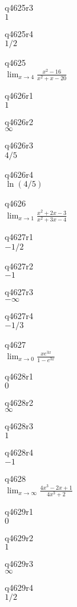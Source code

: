 q4625r3\\
\(\displaystyle 1 \)

q4625r4\\
\(\displaystyle 1/2 \)

q4625\\
\(\displaystyle \lim_{x \rightarrow 4} \frac{x^2 - 16}{x^2 + x - 20} \)

q4626r1\\
\(\displaystyle 1 \)

q4626r2\\
\(\displaystyle \infty \)

q4626r3\\
\(\displaystyle 4/5 \)

q4626r4\\
\(\displaystyle \ln(4/5) \)

q4626\\
\(\displaystyle \lim_{x \rightarrow 1} \frac{x^2 + 2x - 3}{x^2 + 3x - 4} \)

q4627r1\\
\(\displaystyle -1/2 \)

q4627r2\\
\(\displaystyle -1 \)

q4627r3\\
\(\displaystyle -\infty \)

q4627r4\\
\(\displaystyle -1/3 \)

q4627\\
\(\displaystyle \lim_{x \rightarrow 0} \frac{xe^{3x}}{1-e^{3x}} \)

q4628r1\\
\(\displaystyle 0 \)

q4628r2\\
\(\displaystyle \infty \)

q4628r3\\
\(\displaystyle 1 \)

q4628r4\\
\(\displaystyle -1 \)

q4628\\
\(\displaystyle \lim_{x \rightarrow \infty} \frac{4x^3 - 2x + 1}{4x^3 + 2} \)

q4629r1\\
\(\displaystyle 0 \)

q4629r2\\
\(\displaystyle 1 \)

q4629r3\\
\(\displaystyle \infty \)

q4629r4\\
\(\displaystyle 1/2 \)

